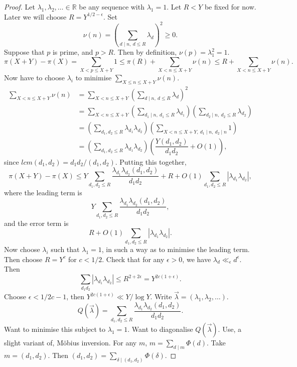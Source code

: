 \documentclass{article}
\newcommand{\R}{\mathbb{R}}
\newcommand{\rb}[1]{\left( #1 \right)}
\newcommand{\abs}[1]{\left\lvert #1 \right\rvert}
\theoremstyle{definition}\newtheorem{definition}{Definition}
\theoremstyle{definition}\newtheorem{remark}[definition]{Remark}
\theoremstyle{definition}\newtheorem*{example}{Example}
\theoremstyle{definition}\newtheorem*{note}{Note}
\begin{document}
\begin{proof}
Let $ \lambda_1, \lambda_2, \dots \in \R $ be any sequence with $ \lambda_1 = 1 $. Let $ R < Y $ be fixed for now. Later we will choose $ R = Y^{1 / 2 - \epsilon} $. Set
$$ \nu\rb{n} = \rb{\sum_{d \mid n, \ d \le R} \lambda_d}^2 \ge 0. $$
Suppose that $ p $ is prime, and $ p > R $. Then by definition, $ \nu\rb{p} = \lambda_1^2 = 1 $.
$$ \pi\rb{X + Y} - \pi\rb{X} = \sum_{X < p \le X + Y} 1 \le \pi\rb{R} + \sum_{X < n \le X + Y} \nu\rb{n} \le R + \sum_{X < n \le X + Y} \nu\rb{n}. $$
Now have to choose $ \lambda_i $ to minimise $ \sum_{X \le n \le X + Y} \nu\rb{n} $.
\begin{align*}
\sum_{X < n \le X + Y} \nu\rb{n}
& = \sum_{X < n \le X + Y} \rb{\sum_{d \mid n, \ d \le R} \lambda_d}^2 \\
& = \sum_{X < n \le X + Y} \rb{\sum_{d_1 \mid n, \ d_1 \le R} \lambda_{d_1}}\rb{\sum_{d_2 \mid n, \ d_2 \le R} \lambda_{d_2}} \\
& = \rb{\sum_{d_1, d_2 \le R} \lambda_{d_1}\lambda_{d_2}}\rb{\sum_{X < n \le X + Y, \ d_1 \mid n, \ d_2 \mid n} 1} \\
& = \rb{\sum_{d_1, d_2 \le R} \lambda_{d_1}\lambda_{d_2}}\rb{\dfrac{Y\rb{d_1, d_2}}{d_1d_2} + O\rb{1}},
\end{align*}
since $ lcm\rb{d_1, d_2} = d_1d_2 / \rb{d_1, d_2} $. Putting this together,
$$ \pi\rb{X + Y} - \pi\rb{X} \le Y\sum_{d_1, d_2 \le R} \dfrac{\lambda_{d_1}\lambda_{d_2}\rb{d_1, d_2}}{d_1d_2} + R + O\rb{1}\sum_{d_1, d_2 \le R} \abs{\lambda_{d_1}\lambda_{d_2}}, $$
where the leading term is
$$ Y\sum_{d_1, d_2 \le R} \dfrac{\lambda_{d_1}\lambda_{d_2}\rb{d_1, d_2}}{d_1d_2}, $$
and the error term is
$$ R + O\rb{1}\sum_{d_1, d_2 \le R} \abs{\lambda_{d_1}\lambda_{d_2}}. $$
Now choose $ \lambda_i $ such that $ \lambda_1 = 1 $, in such a way as to minimise the leading term. Then choose $ R = Y^c $ for $ c < 1 / 2 $. Check that for any $ \epsilon > 0 $, we have $ \lambda_d \ll_\epsilon d^\epsilon $. Then
$$ \sum_{d_1d_2} \abs{\lambda_{d_1}\lambda_{d_2}} \le R^{2 + 2\epsilon} = Y^{2c\rb{1 + \epsilon}}. $$
Choose $ \epsilon < 1 / 2c - 1 $, then $ Y^{2c\rb{1 + \epsilon}} \ll Y / \log Y $. Write $ \overrightarrow{\lambda} = \rb{\lambda_1, \lambda_2, \dots} $.
$$ Q\rb{\overrightarrow{\lambda}} = \sum_{d_1, d_2 \le R} \dfrac{\lambda_{d_1}\lambda_{d_2}\rb{d_1, d_2}}{d_1d_2}. $$
Want to minimise this subject to $ \lambda_1 = 1 $. Want to diagonalise $ Q\rb{\overrightarrow{\lambda}} $. Use, a slight variant of, M\"obius inversion. For any $ m $, $ m = \sum_{d \mid m} \Phi\rb{d} $. Take $ m = \rb{d_1, d_2} $. Then $ \rb{d_1, d_2} = \sum_{\delta \mid \rb{d_1, d_2}} \Phi\rb{\delta} $.

\end{proof}
\end{document}
